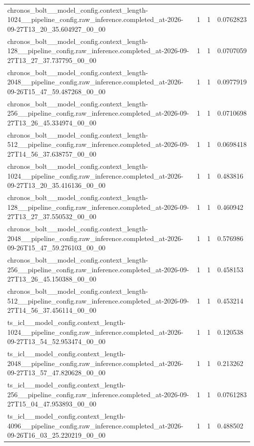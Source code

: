 \begin{tabular}{llll}
chronos\_bolt\_\_model\_config.context\_length-1024\_\_pipeline\_config.raw\_inference.completed\_at-2026-09-27T13\_20\_35.604927\_00\_00 & 1 & 1 & 0.0762823 \\
chronos\_bolt\_\_model\_config.context\_length-128\_\_pipeline\_config.raw\_inference.completed\_at-2026-09-27T13\_27\_37.737795\_00\_00 & 1 & 1 & 0.0707059 \\
chronos\_bolt\_\_model\_config.context\_length-2048\_\_pipeline\_config.raw\_inference.completed\_at-2026-09-26T15\_47\_59.487268\_00\_00 & 1 & 1 & 0.0977919 \\
chronos\_bolt\_\_model\_config.context\_length-256\_\_pipeline\_config.raw\_inference.completed\_at-2026-09-27T13\_26\_45.334974\_00\_00 & 1 & 1 & 0.0710698 \\
chronos\_bolt\_\_model\_config.context\_length-512\_\_pipeline\_config.raw\_inference.completed\_at-2026-09-27T14\_56\_37.638757\_00\_00 & 1 & 1 & 0.0698418 \\
chronos\_bolt\_\_model\_config.context\_length-1024\_\_pipeline\_config.raw\_inference.completed\_at-2026-09-27T13\_20\_35.416136\_00\_00 & 1 & 1 & 0.483816 \\
chronos\_bolt\_\_model\_config.context\_length-128\_\_pipeline\_config.raw\_inference.completed\_at-2026-09-27T13\_27\_37.550532\_00\_00 & 1 & 1 & 0.460942 \\
chronos\_bolt\_\_model\_config.context\_length-2048\_\_pipeline\_config.raw\_inference.completed\_at-2026-09-26T15\_47\_59.276103\_00\_00 & 1 & 1 & 0.576986 \\
chronos\_bolt\_\_model\_config.context\_length-256\_\_pipeline\_config.raw\_inference.completed\_at-2026-09-27T13\_26\_45.150388\_00\_00 & 1 & 1 & 0.458153 \\
chronos\_bolt\_\_model\_config.context\_length-512\_\_pipeline\_config.raw\_inference.completed\_at-2026-09-27T14\_56\_37.456114\_00\_00 & 1 & 1 & 0.453214 \\
ts\_icl\_\_model\_config.context\_length-1024\_\_pipeline\_config.raw\_inference.completed\_at-2026-09-27T13\_54\_52.953474\_00\_00 & 1 & 1 & 0.120538 \\
ts\_icl\_\_model\_config.context\_length-2048\_\_pipeline\_config.raw\_inference.completed\_at-2026-09-27T13\_57\_47.820628\_00\_00 & 1 & 1 & 0.213262 \\
ts\_icl\_\_model\_config.context\_length-256\_\_pipeline\_config.raw\_inference.completed\_at-2026-09-27T15\_04\_47.953893\_00\_00 & 1 & 1 & 0.0761283 \\
ts\_icl\_\_model\_config.context\_length-4096\_\_pipeline\_config.raw\_inference.completed\_at-2026-09-26T16\_03\_25.220219\_00\_00 & 1 & 1 & 0.488502 \\

\end{tabular}
